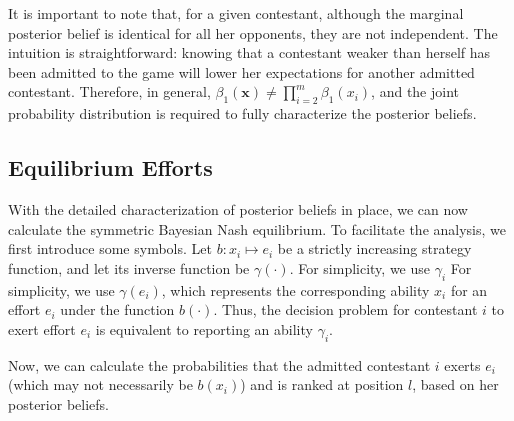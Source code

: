 It is important to note that, for a given contestant, although the marginal posterior belief is identical for all her opponents, they are not independent. The intuition is straightforward: knowing that a contestant weaker than herself has been admitted to the game will lower her expectations for another admitted contestant. Therefore, in general, $\beta_1(\mathbf{x}) \neq \prod_{i=2}^{m} \beta_1(x_i)$, and the joint probability distribution is required to fully characterize the posterior beliefs.


\subsection{Equilibrium Efforts}
\label{subsec:Equilibrium Efforts}
With the detailed characterization of posterior beliefs in place, we can now calculate the symmetric Bayesian Nash equilibrium. To facilitate the analysis, we first introduce some symbols. Let \( b: x_i \mapsto e_i \) be a strictly increasing strategy function, and let its inverse function be \( \gamma(\cdot) \). For simplicity, we use \( \gamma_i \) For simplicity, we use \( \gamma(e_i) \), which represents the corresponding ability \( x_i \) for an effort  \( e_i \) under the function $b(\cdot)$. Thus, the decision problem for contestant \(i\) to exert effort  \(e_i\) is equivalent to reporting an ability \(\gamma_i\).


Now, we can calculate the probabilities that the admitted contestant $i$ exerts $e_i$ (which may not necessarily be $b(x_i)$) and is ranked at position $l$, based on her posterior beliefs.

